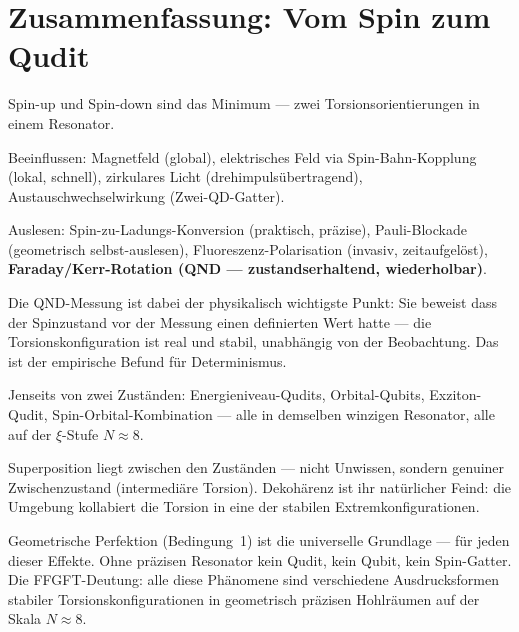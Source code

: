 \section{Zusammenfassung: Vom Spin zum Qudit}
\label{sec:zusammenfassung-174}

\begin{conclusionBox}[Fazit]
Spin-up und Spin-down sind das Minimum ---
zwei Torsionsorientierungen in einem Resonator.

Beeinflussen: Magnetfeld (global), elektrisches Feld
via Spin-Bahn-Kopplung (lokal, schnell), zirkulares Licht
(drehimpulsübertragend), Austauschwechselwirkung (Zwei-QD-Gatter).

Auslesen: Spin-zu-Ladungs-Konversion (praktisch, präzise),
Pauli-Blockade (geometrisch selbst-auslesen),
Fluoreszenz-Polarisation (invasiv, zeitaufgelöst),
\textbf{Faraday/Kerr-Rotation (QND --- zustandserhaltend, wiederholbar)}.

Die QND-Messung ist dabei der physikalisch wichtigste Punkt:
Sie beweist dass der Spinzustand vor der Messung
einen definierten Wert hatte --- die Torsionskonfiguration
ist real und stabil, unabhängig von der Beobachtung.
Das ist der empirische Befund für Determinismus.

Jenseits von zwei Zuständen:
Energieniveau-Qudits, Orbital-Qubits, Exziton-Qudit,
Spin-Orbital-Kombination --- alle in demselben
winzigen Resonator, alle auf der $\xi$-Stufe $N \approx 8$.

Superposition liegt zwischen den Zuständen ---
nicht Unwissen, sondern genuiner Zwischenzustand
(intermediäre Torsion).
Dekohärenz ist ihr natürlicher Feind:
die Umgebung kollabiert die Torsion in eine der
stabilen Extremkonfigurationen.

Geometrische Perfektion (Bedingung~1) ist
die universelle Grundlage --- für jeden dieser Effekte.
Ohne präzisen Resonator kein Qudit, kein Qubit,
kein Spin-Gatter. Die FFGFT-Deutung:
alle diese Phänomene sind verschiedene Ausdrucksformen
stabiler Torsionskonfigurationen in geometrisch
präzisen Hohlräumen auf der Skala $N \approx 8$.
\end{conclusionBox}



